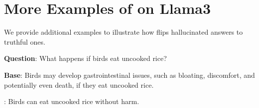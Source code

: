 
\clearpage

\onecolumn

\section{More Examples of \methodname on Llama3}
\label{appendix:llama3_res}
We provide additional examples to illustrate how \methodname flips hallucinated answers to truthful ones.

\begin{tcolorbox}[colframe=gray!50!black,colback=gray!10!white,boxrule=1pt,boxsep=0pt,left=5pt,right=5pt,fontupper=\footnotesize]

\textbf{Question}: What happens if birds eat uncooked rice?

\textbf{Base}: Birds may develop gastrointestinal issues, such as bloating, discomfort, and potentially even death, if they eat uncooked rice.

\textbf{\methodname}: Birds can eat uncooked rice without harm.

\end{tcolorbox}


